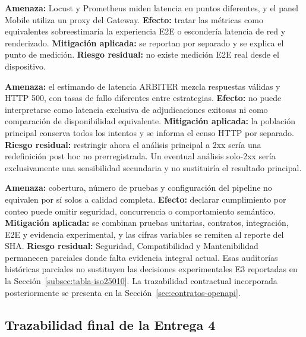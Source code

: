 \textbf{Amenaza:} Locust y Prometheus miden latencia en puntos diferentes, y el
panel Mobile utiliza un proxy del Gateway. \textbf{Efecto:} tratar las métricas
como equivalentes sobreestimaría la experiencia E2E o escondería latencia de
red y renderizado. \textbf{Mitigación aplicada:} se reportan por separado y se
explica el punto de medición. \textbf{Riesgo residual:} no existe medición E2E
real desde el dispositivo.

\textbf{Amenaza:} el estimando de latencia ARBITER mezcla respuestas válidas y
HTTP 500, con tasas de fallo diferentes entre estrategias. \textbf{Efecto:} no
puede interpretarse como latencia exclusiva de adjudicaciones exitosas ni como
comparación de disponibilidad equivalente. \textbf{Mitigación aplicada:} la
población principal conserva todos los intentos y se informa el censo HTTP por
separado. \textbf{Riesgo residual:} restringir ahora el análisis principal a
2xx sería una redefinición post hoc no prerregistrada. Un eventual análisis
solo-2xx sería exclusivamente una sensibilidad secundaria y no sustituiría el
resultado principal.

\textbf{Amenaza:} cobertura, número de pruebas y configuración del pipeline no
equivalen por sí solos a calidad completa. \textbf{Efecto:} declarar
cumplimiento por conteo puede omitir seguridad, concurrencia o comportamiento
semántico. \textbf{Mitigación aplicada:} se combinan pruebas unitarias,
contratos, integración, E2E y evidencia experimental, y las cifras variables se
remiten al reporte del SHA. \textbf{Riesgo residual:} Seguridad,
Compatibilidad y Mantenibilidad permanecen parciales donde falta evidencia
integral actual. Esas auditorías históricas parciales no sustituyen las
decisiones experimentales E3 reportadas en la
Sección~\ref{subsec:tabla-iso25010}. La trazabilidad contractual incorporada
posteriormente se presenta en la Sección~\ref{sec:contratos-openapi}.

\subsection{Trazabilidad final de la Entrega 4}
\label{subsec:trazabilidad-final}

